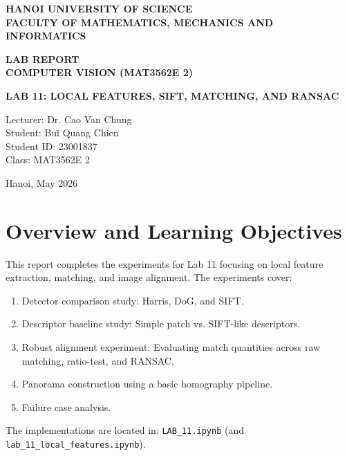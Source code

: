 \documentclass[12pt,a4paper]{article}
\begin{document}
\begin{titlepage}
    \centering
    \vspace*{2cm}

    {\LARGE\bfseries HANOI UNIVERSITY OF SCIENCE\\[0.3cm]
    FACULTY OF MATHEMATICS, MECHANICS AND INFORMATICS\\[0.8cm]}

    {\huge\bfseries LAB REPORT\\[0.4cm]
    COMPUTER VISION (MAT3562E 2)\\[0.4cm]}

    {\Large\bfseries LAB 11: LOCAL FEATURES, SIFT, MATCHING, AND RANSAC\\[1.2cm]}

    \begin{flushleft}
    {\large
    Lecturer: Dr. Cao Van Chung\\
    Student: Bui Quang Chien\\
    Student ID: 23001837\\
    Class: MAT3562E 2
    }
    \end{flushleft}

    \vfill
    {\large Hanoi, May 2026}
\end{titlepage}

\tableofcontents
\newpage

\section{Overview and Learning Objectives}
This report completes the experiments for Lab 11 focusing on local feature extraction, matching, and image alignment. The experiments cover:
\begin{enumerate}
    \item Detector comparison study: Harris, DoG, and SIFT.
    \item Descriptor baseline study: Simple patch vs. SIFT-like descriptors.
    \item Robust alignment experiment: Evaluating match quantities across raw matching, ratio-test, and RANSAC.
    \item Panorama construction using a basic homography pipeline.
    \item Failure case analysis.
\end{enumerate}

The implementations are located in:
\texttt{LAB\_11.ipynb} (and \texttt{lab\_11\_local\_features.ipynb}).
\end{document}

